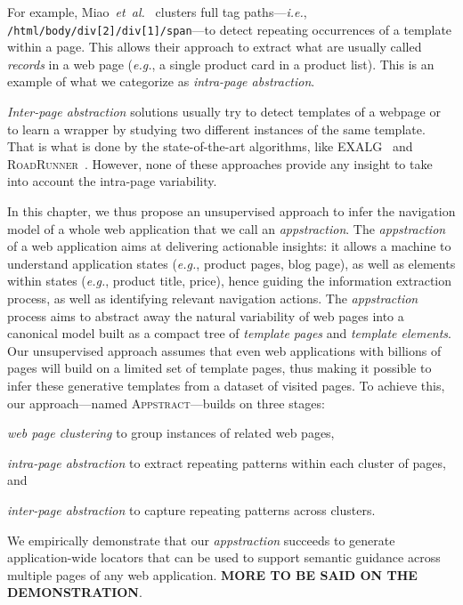 For example, Miao~\textit{et~al.}~\cite{MiaoExtractingClustering} clusters full tag paths---\emph{i.e.}, \texttt{/html/bo\-dy/div[2]/div[1]/span}---to detect repeating occurrences of a template within a page.
This allows their approach to extract what are usually called \emph{records} in a web page (\emph{e.g.}, a single product card in a product list).
This is an example of what we categorize as \emph{intra-page abstraction}.

\emph{Inter-page abstraction} solutions usually try to detect templates of a webpage or to learn a wrapper by studying two different instances of the same template.
That is what is done by the state-of-the-art algorithms, like EXALG~\cite{ArasuExtractingPages} and \textsc{RoadRunner}~\cite{Crescenzi2001RoadRunner:Sites}.
However, none of these approaches provide any insight to take into account the intra-page variability.

In this chapter, we thus propose an unsupervised approach to infer the navigation model of a whole web application that we call an \textit{appstraction}.
The \textit{appstraction} of a web application aims at delivering actionable insights: it allows a machine to understand application states (\emph{e.g.}, product pages, blog page), as well as elements within states (\emph{e.g.}, product title, price), hence guiding the information extraction process, as well as identifying relevant navigation actions.
The \textit{appstraction} process aims to abstract away the natural variability of web pages into a canonical model built as a compact tree of \emph{template pages} and \emph{template elements}.
Our unsupervised approach assumes that even web applications with billions of pages will build on a limited set of template pages, thus making it possible to infer these generative templates from a dataset of visited pages.
To achieve this, our approach---named \textsc{Appstract}---builds on three stages:
\begin{inparaenum}
    \item \textit{web page clustering} to group instances of related web pages,
    \item \textit{intra-page abstraction} to extract repeating patterns within each cluster of pages, and
    \item \textit{inter-page abstraction} to capture repeating patterns across clusters.
\end{inparaenum}

We empirically demonstrate that our \emph{appstraction} succeeds to generate application-wide locators that can be used to support semantic guidance across multiple pages of any web application.
\textbf{MORE TO BE SAID ON THE DEMONSTRATION}.

